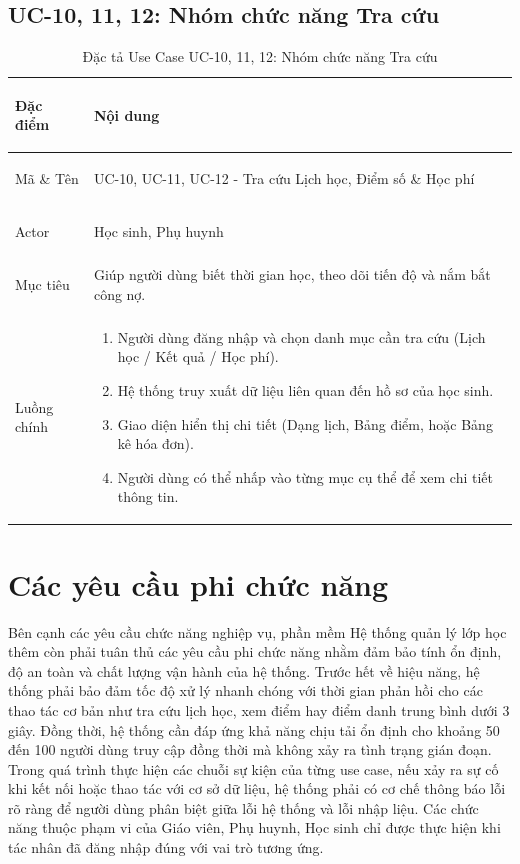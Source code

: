 \clearpage
\subsection{UC-10, 11, 12: Nhóm chức năng Tra cứu}

\begin{table}[htbp]
\centering
\small
\caption{Đặc tả Use Case UC-10, 11, 12: Nhóm chức năng Tra cứu}
\label{tab:uc10-11-12-tra-cuu}
\begin{tabularx}{\textwidth}{|>{\bfseries\raggedright\arraybackslash}p{2.5cm}|X|}
\hline
Đặc điểm & Nội dung \\ \hline
Mã \& Tên & UC-10, UC-11, UC-12 - Tra cứu Lịch học, Điểm số \& Học phí \\ \hline
Actor & Học sinh, Phụ huynh \\ \hline
Mục tiêu & Giúp người dùng biết thời gian học, theo dõi tiến độ và nắm bắt công nợ. \\ \hline
Luồng chính & 
\begin{enumerate}
    \item Người dùng đăng nhập và chọn danh mục cần tra cứu (Lịch học / Kết quả / Học phí).
    \item Hệ thống truy xuất dữ liệu liên quan đến hồ sơ của học sinh.
    \item Giao diện hiển thị chi tiết (Dạng lịch, Bảng điểm, hoặc Bảng kê hóa đơn).
    \item Người dùng có thể nhấp vào từng mục cụ thể để xem chi tiết thông tin.
\end{enumerate} \\ \hline
\end{tabularx}
\end{table}

\section{Các yêu cầu phi chức năng}
Bên cạnh các yêu cầu chức năng nghiệp vụ, phần mềm Hệ thống quản lý lớp học thêm còn phải tuân thủ các yêu cầu phi chức năng nhằm đảm bảo tính ổn định, độ an toàn và chất lượng vận hành của hệ thống. Trước hết về hiệu năng, hệ thống phải bảo đảm tốc độ xử lý nhanh chóng với thời gian phản hồi cho các thao tác cơ bản như tra cứu lịch học, xem điểm hay điểm danh trung bình dưới 3 giây. Đồng thời, hệ thống cần đáp ứng khả năng chịu tải ổn định cho khoảng 50 đến 100 người dùng truy cập đồng thời mà không xảy ra tình trạng gián đoạn. Trong quá trình thực hiện các chuỗi sự kiện của từng use case, nếu xảy ra sự cố
khi kết nối hoặc thao tác với cơ sở dữ liệu, hệ thống phải có cơ chế thông báo lỗi rõ ràng để người dùng phân biệt giữa lỗi hệ thống và lỗi nhập liệu. Các chức năng thuộc phạm vi của Giáo viên, Phụ huynh, Học sinh chỉ được thực hiện khi tác nhân đã đăng nhập đúng với vai trò tương ứng.

